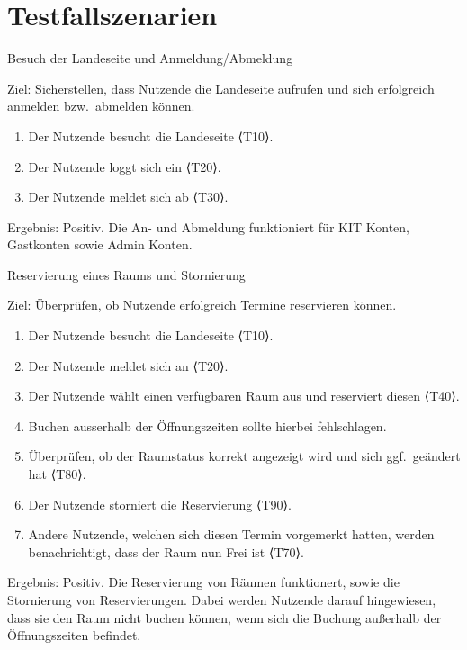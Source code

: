 \newpage

\section{Testfallszenarien}\label{sec:testfallszenarien}
\begin{scenario}{10}{Besuch der Landeseite und Anmeldung/Abmeldung}
    \item[Ziel:] Sicherstellen, dass Nutzende die Landeseite aufrufen und sich erfolgreich anmelden bzw.\ abmelden können.
    \begin{enumerate}
        \item Der Nutzende besucht die Landeseite ⟨T10⟩.
        \item Der Nutzende loggt sich ein ⟨T20⟩.
        \item Der Nutzende meldet sich ab ⟨T30⟩.
    \end{enumerate}
    \item[Ergebnis:] Positiv.
    Die An- und Abmeldung funktioniert für KIT Konten, Gastkonten sowie Admin Konten.
\end{scenario}

\begin{scenario}{20}{Reservierung eines Raums und Stornierung}
    \item[Ziel:] Überprüfen, ob Nutzende erfolgreich Termine reservieren können.
    \begin{enumerate}
        \item Der Nutzende besucht die Landeseite ⟨T10⟩.
        \item Der Nutzende meldet sich an ⟨T20⟩.
        \item Der Nutzende wählt einen verfügbaren Raum aus und reserviert diesen ⟨T40⟩.
        \item Buchen ausserhalb der Öffnungszeiten sollte hierbei fehlschlagen.
        \item Überprüfen, ob der Raumstatus korrekt angezeigt wird und sich ggf.\ geändert hat ⟨T80⟩.
        \item Der Nutzende storniert die Reservierung ⟨T90⟩.
        \item Andere Nutzende, welchen sich diesen Termin vorgemerkt hatten, werden benachrichtigt, dass der Raum nun Frei ist ⟨T70⟩.
    \end{enumerate}
    \item[Ergebnis:] Positiv.
    Die Reservierung von Räumen funktionert, sowie die Stornierung von Reservierungen.
    Dabei werden Nutzende darauf hingewiesen, dass sie den Raum nicht buchen können, wenn sich die Buchung außerhalb der Öffnungszeiten befindet.
\end{scenario}

